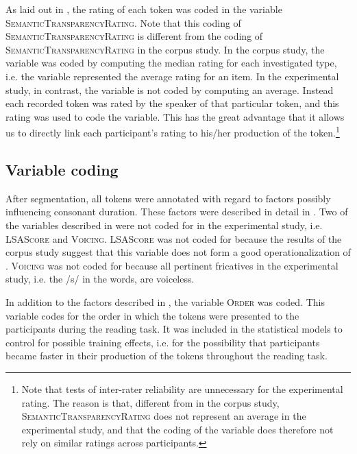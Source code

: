  As laid out in , the rating of each token was coded in the variable  \textsc{SemanticTransparencyRating}. Note that this coding of \textsc{SemanticTransparency\-Rating} is different from the coding of \textsc{SemanticTransparencyRating} in the corpus study. In the corpus study, the variable was coded by computing the median rating for each investigated type, i.e. the variable represented the average rating for an item. 
 In the experimental study, in contrast, the variable is not coded by computing an average. Instead each recorded token 
 was rated by the speaker of that particular token, and this rating was used to code the variable.
 This has the great advantage that it allows us to directly link each participant's rating to his/her production of the token.\footnote{Note that tests of inter-rater reliability are unnecessary for the experimental rating. The reason is that, different from in the corpus study, \textsc{SemanticTransparencyRating} does not represent an average in the experimental study, and that the coding of the variable does therefore not rely on similar ratings across participants.} 


\subsection{Variable coding} \label{variable coding experiment}
 


After segmentation, all tokens were annotated with regard to factors possibly influencing consonant duration. These factors were described in detail in . 
Two of the variables described in  were not coded for in the experimental study, i.e. \textsc{LSAScore} and \textsc{Voicing}. 
\textsc{LSAScore} was not coded for because the results of the corpus study suggest that this variable does not form a good operationalization of . 
\textsc{Voicing} was not coded for because all pertinent fricatives in the experimental study, i.e. the /s/ in the words, are voiceless.

In addition to the factors described in , the variable \textsc{Order} was coded. This variable codes for the order in which the tokens were presented to the participants during the reading task. It was included in the statistical models to control for possible training effects, i.e. for the possibility that participants became faster in their production of the tokens throughout the reading task.

